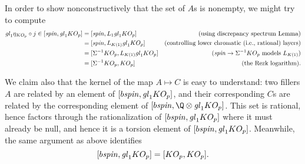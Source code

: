 In order to show nonconstructively that the set of $A$s is nonempty, we might try to compute
\begin{align*}
\mathit{gl}_1 \eta_{KO_p} \circ j \in [\mathit{spin}, \mathit{gl}_1 KO_p] & = [\mathit{spin}, L_1 \mathit{gl}_1 KO_p] & \text{(using discrepancy spectrum Lemma)} \\
& = [\mathit{spin}, L_{K(1)} \mathit{gl}_1 KO_p] & \text{(controlling lower chromatic (i.e., rational) layers)} \\
& = [\Sigma^{-1} KO_p, L_{K(1)} \mathit{gl}_1 KO_p] & \text{($\mathit{spin} \to \Sigma^{-1} KO_p$ models $L_{K(1)}$)} \\
& = [\Sigma^{-1} KO_p, KO_p] & \text{(the Rezk logarithm)}.
\end{align*}

We claim also that the kernel of the map $A \mapsto C$ is easy to understand: two fillers $A$ are related by an element of $[b\mathit{spin}, \mathit{gl}_1 KO_p]$, and their corresponding $C$s are related by the corresponding element of $[b\spin, \Q \otimes \gl_1 KO_p]$.  This set is rational, hence factors through the rationalization of $[b\mathit{spin}, \mathit{gl}_1 KO_p]$ where it must already be null, and hence it is a torsion element of $[b\mathit{spin}, \mathit{gl}_1 KO_p]$.  Meanwhile, the same argument as above identifies \[[b\mathit{spin}, \mathit{gl}_1 KO_p] = [KO_p, KO_p].\]

